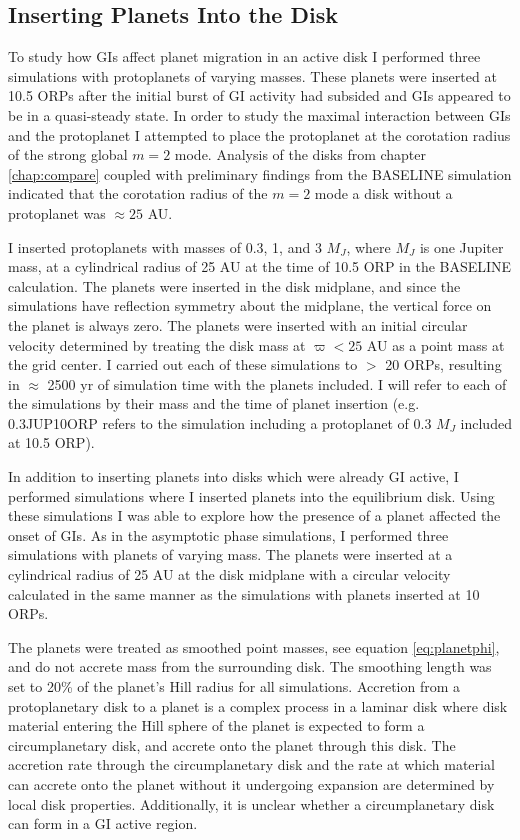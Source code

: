 \subsection{Inserting Planets Into the Disk}\label{sec:PL:insert}

To study how GIs affect planet migration in an active disk I performed three simulations with protoplanets of varying masses. These planets were inserted at 10.5 ORPs after the initial burst of GI activity had subsided and GIs appeared to be in a quasi-steady state. In order to study the maximal interaction between GIs and the protoplanet I attempted to place the protoplanet at the corotation radius of the strong global $m = 2$ mode. Analysis of the disks from chapter \ref{chap:compare} coupled with preliminary findings from the BASELINE simulation indicated that the corotation radius of the $m = 2$ mode a disk without a protoplanet was $\approx 25$ AU. 

I inserted protoplanets with masses of 0.3, 1, and 3 $M_{J}$, where $M_J$ is one Jupiter mass, at a cylindrical radius of 25 AU at the time of 10.5 ORP in the BASELINE calculation. The planets were inserted in the disk midplane, and since the simulations have reflection symmetry about the midplane, the vertical force on the planet is always zero. The planets were inserted with an initial circular velocity determined by treating the disk mass at $\varpi < 25$ AU as a point mass at the grid center. I carried out each of these simulations to $>$ 20 ORPs, resulting in $\approx$ 2500 yr of simulation time with the planets included. I will refer to each of the simulations by their mass and the time of planet insertion (e.g. 0.3JUP10ORP refers to the simulation including a protoplanet of 0.3 $M_{J}$ included at 10.5 ORP). 

In addition to inserting planets into disks which were already GI active, I performed simulations where I inserted planets into the equilibrium disk. Using these simulations I was able to explore how the presence of a planet affected the onset of GIs. As in the asymptotic phase simulations, I performed three simulations with planets of varying mass. The planets were inserted at a cylindrical radius of 25 AU at the disk midplane with a circular velocity calculated in the same manner as the simulations with planets inserted at 10 ORPs. 

The planets were treated as smoothed point masses, see equation \eqref{eq:planetphi}, and do not accrete mass from the surrounding disk. The smoothing length was set to 20\% of the planet's Hill radius for all simulations. Accretion from a protoplanetary disk to a planet is a complex process in a laminar disk where disk material entering the Hill sphere of the planet is expected to form a circumplanetary disk, and accrete onto the planet through this disk. The accretion rate through the circumplanetary disk and the rate at which material can accrete onto the planet without it undergoing expansion are determined by local disk properties. Additionally, it is unclear whether a circumplanetary disk can form in a GI active region.


